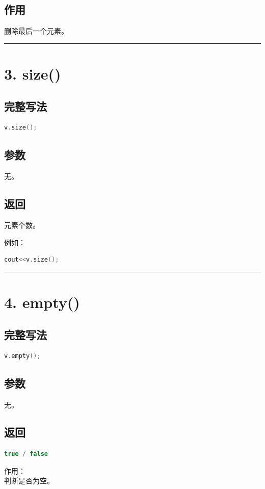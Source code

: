 \documentclass[10pt,twocolumn]{extarticle}
\begin{document}
\subsection{作用}
删除最后一个元素。

\noindent\rule{\linewidth}{0.4pt}

\section{3. size()}

\subsection{完整写法}
\begin{lstlisting}[language=C++]
v.size();
\end{lstlisting}

\subsection{参数}
无。

\subsection{返回}
元素个数。

例如：
\begin{lstlisting}[language=C++]
cout<<v.size();
\end{lstlisting}

\noindent\rule{\linewidth}{0.4pt}

\section{4. empty()}

\subsection{完整写法}
\begin{lstlisting}[language=C++]
v.empty();
\end{lstlisting}

\subsection{参数}
无。

\subsection{返回}
\begin{lstlisting}[language=C++]
true / false
\end{lstlisting}
作用：\\
判断是否为空。
\end{document}
